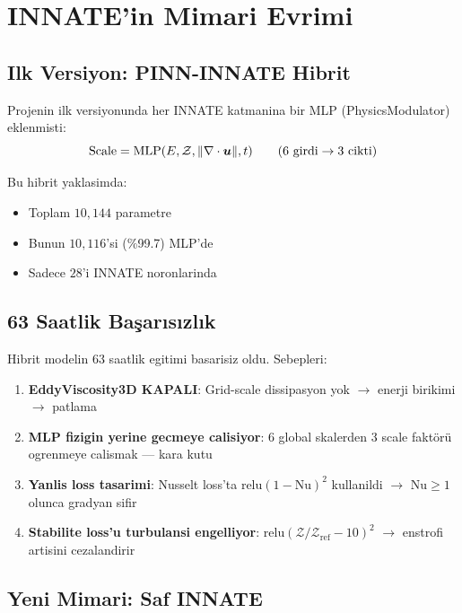 \section{INNATE'in Mimari Evrimi}
\label{sec:mimari_evrim}

\subsection{Ilk Versiyon: PINN-INNATE Hibrit}

Projenin ilk versiyonunda her INNATE katmanina bir MLP (PhysicsModulator) eklenmisti:
\begin{equation}
\text{Scale} = \text{MLP}(E, \mathcal{Z}, \|\nabla \cdot\bm{u}\|, t) \qquad\text{(6 girdi} \to \text{3 cikti)}
\end{equation}

Bu hibrit yaklasimda:
\begin{itemize}
\item Toplam $10{,}144$ parametre
\item Bunun $10{,}116$'si (\%99.7) MLP'de
\item Sadece $28$'i INNATE noronlarinda
\end{itemize}

\subsection{63 Saatlik Başarısızlık}

Hibrit modelin 63 saatlik egitimi basarisiz oldu. Sebepleri:
\begin{enumerate}
\item \textbf{EddyViscosity3D KAPALI}: Grid-scale dissipasyon yok $\to$ enerji birikimi $\to$ patlama
\item \textbf{MLP fizigin yerine gecmeye calisiyor}: 6 global skalerden 3 scale faktörü ogrenmeye calismak --- kara kutu
\item \textbf{Yanlis loss tasarimi}: Nusselt loss'ta $\text{relu}(1-\text{Nu})^2$ kullanildi $\to$ $\text{Nu}\geq1$ olunca gradyan sifir
\item \textbf{Stabilite loss'u turbulansi engelliyor}: $\text{relu}(\mathcal{Z}/\mathcal{Z}_\text{ref}-10)^2$ $\to$ enstrofi artisini cezalandirir
\end{enumerate}

\subsection{Yeni Mimari: Saf INNATE}


